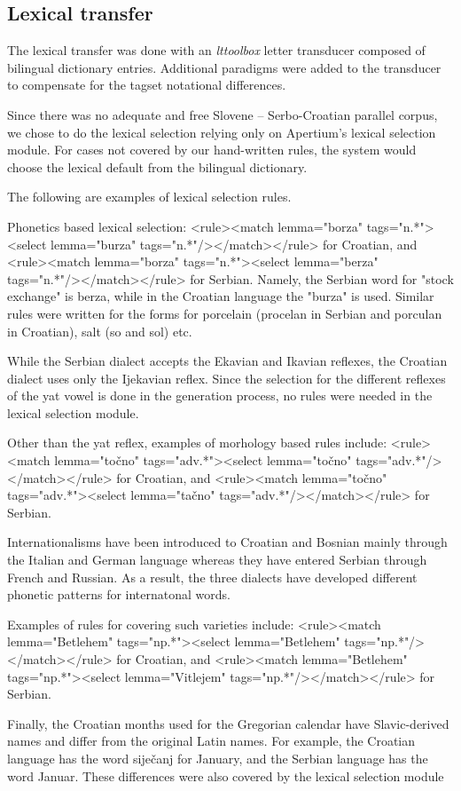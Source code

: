 \subsection{Lexical transfer}
The lexical transfer was done with an \emph{lttoolbox} letter
transducer composed of bilingual dictionary entries. Additional
paradigms were added to the transducer to compensate for the tagset
notational differences.

Since there was no adequate and free Slovene -- Serbo-Croatian parallel corpus, 
we chose to do the lexical selection relying only on Apertium's lexical selection module.
For cases not covered by our hand-written rules, the system would choose the lexical 
default from the bilingual dictionary.

The following are examples of lexical selection rules.

Phonetics based lexical selection:
 <rule><match lemma="borza" tags="n.*"><select lemma="burza" tags="n.*"/></match></rule>
for Croatian, and 
 <rule><match lemma="borza" tags="n.*"><select lemma="berza" tags="n.*"/></match></rule>
for Serbian.
Namely, the Serbian word for "stock exchange" is berza, while in the Croatian language the "burza" is used.
Similar rules were written for the forms for porcelain (procelan in Serbian and porculan in Croatian), 
salt (so and sol) etc.

While the Serbian dialect accepts the Ekavian and Ikavian reflexes, 
the Croatian dialect uses only the Ijekavian reflex.
Since the selection for the different reflexes of the yat vowel is done in the generation process,
no rules were needed in the lexical selection module.

Other than the yat reflex, examples of morhology based rules include:
 <rule><match lemma="točno" tags="adv.*"><select lemma="točno" tags="adv.*"/></match></rule>
for Croatian, and
 <rule><match lemma="točno" tags="adv.*"><select lemma="tačno" tags="adv.*"/></match></rule>
for Serbian.


Internationalisms have been introduced to Croatian and Bosnian mainly through the Italian and German language
whereas they have entered Serbian through French and Russian. 
As a result, the three dialects have developed different phonetic patterns for internatonal words.

Examples of rules for covering such varieties include:
 <rule><match lemma="Betlehem" tags="np.*"><select lemma="Betlehem" tags="np.*"/></match></rule>
for Croatian, and
 <rule><match lemma="Betlehem" tags="np.*"><select lemma="Vitlejem" tags="np.*"/></match></rule>
for Serbian.

Finally, the Croatian months used for the Gregorian calendar have Slavic-derived names and differ from the original Latin names.
For example, the Croatian language has the word siječanj for January, and 
the Serbian language has the word Januar.
These differences were also covered by the lexical selection module



